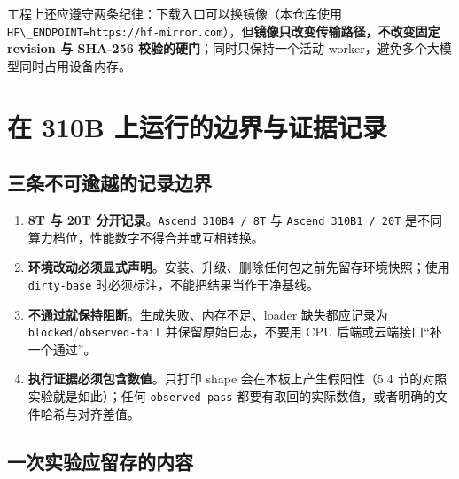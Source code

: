 工程上还应遵守两条纪律：下载入口可以换镜像（本仓库使用
\passthrough{\lstinline!HF\_ENDPOINT=https://hf-mirror.com!}），但\textbf{镜像只改变传输路径，不改变固定
revision 与 SHA-256 校验的硬门}；同时只保持一个活动
worker，避免多个大模型同时占用设备内存。

\section{在 310B 上运行的边界与证据记录}\label{src-book-chapter5-h31}

\subsection{三条不可逾越的记录边界}\label{src-book-chapter5-h32}

\begin{enumerate}
\def\labelenumi{\arabic{enumi}.}
\tightlist
\item
  \textbf{8T 与 20T
  分开记录}。\passthrough{\lstinline!Ascend 310B4 / 8T!} 与
  \passthrough{\lstinline!Ascend 310B1 / 20T!}
  是不同算力档位，性能数字不得合并或互相转换。
\item
  \textbf{环境改动必须显式声明}。安装、升级、删除任何包之前先留存环境快照；使用
  \passthrough{\lstinline!dirty-base!}
  时必须标注，不能把结果当作干净基线。
\item
  \textbf{不通过就保持阻断}。生成失败、内存不足、loader 缺失都应记录为
  \passthrough{\lstinline!blocked!}/\passthrough{\lstinline!observed-fail!}
  并保留原始日志，不要用 CPU 后端或云端接口``补一个通过''。
\item
  \textbf{执行证据必须包含数值}。只打印 shape 会在本板上产生假阳性（5.4
  节的对照实验就是如此）；任何 \passthrough{\lstinline!observed-pass!}
  都要有取回的实际数值，或者明确的文件哈希与对齐差值。
\end{enumerate}

\subsection{一次实验应留存的内容}\label{src-book-chapter5-h33}

